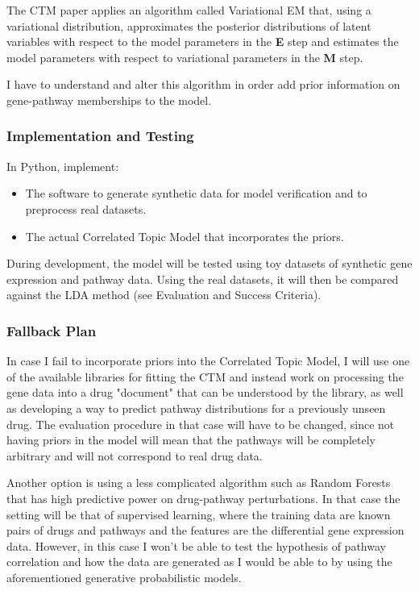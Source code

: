 \documentclass[12pt,a4]{article}
\begin{document}
The CTM paper\cite{2007} applies an algorithm called Variational EM that, using a variational distribution, approximates the posterior distributions of latent variables with respect to the model parameters in the \textbf{E} step and estimates the model parameters with respect to variational parameters in the \textbf{M} step.

I have to understand and alter this algorithm in order add prior information on gene-pathway memberships to the model.

\subsubsection*{Implementation and Testing}

In Python, implement:

\begin{itemize}
\item The software to generate synthetic data for model verification and to preprocess real datasets.
\item The actual Correlated Topic Model that incorporates the priors.
\end{itemize}

During development, the model will be tested using toy datasets of synthetic gene expression and pathway data. Using the real datasets, it will then be compared against the LDA method (see Evaluation and Success Criteria).

\subsubsection*{Fallback Plan}
In case I fail to incorporate priors into the Correlated Topic Model, I will use one of the available libraries for fitting the CTM and instead work on processing the gene data into a drug "document" that can be understood by the library, as well as developing a way to predict pathway distributions for a previously unseen drug. The evaluation procedure in that case will have to be changed, since not having priors in the model will mean that the pathways will be completely arbitrary and will not correspond to real drug data.

Another option is using a less complicated algorithm such as Random Forests\cite{Breiman:2001:RF:570181.570182} that has high predictive power on drug-pathway perturbations\cite{Riddick15012011}. In that case the setting will be that of supervised learning, where the training data are known pairs of drugs and pathways and the features are the differential gene expression data. However, in this case I won't be able to test the hypothesis of pathway correlation and how the data are generated as I would be able to by using the aforementioned generative probabilistic models.
\end{document}

